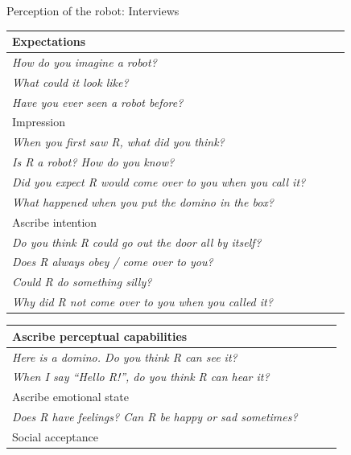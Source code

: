 \documentclass[compress]{beamer}
\renewcommand{\bf}{\Medium}
\begin{document}
\begin{frame}{Perception of the robot: Interviews}
\scriptsize
    \begin{multicols}{2}
    \begin{table}[]
        \begin{tabularx}{\linewidth}{p{0.9\linewidth}}

    \toprule
    {\bf Expectations} \tabularnewline
    \midrule
    \emph{How do you imagine a robot?} \tabularnewline
    \emph{What could it look like?} \tabularnewline
    \emph{Have you ever seen a robot before?} \tabularnewline

    \toprule
    {\bf Impression} \tabularnewline
    \midrule


    \emph{When you first saw R, what did you think?} \tabularnewline
    \emph{Is R a robot? How do you know?} \tabularnewline
    \emph{Did you expect R would come over to you when you call it?} \tabularnewline
    \emph{What happened when you put the domino in the box?} \tabularnewline

    \toprule
    {\bf Ascribe intention} \tabularnewline
    \midrule


    \emph{Do you think R could go out the door all by itself?} \tabularnewline	
    \emph{Does R always obey / come over to you?} \tabularnewline
    \emph{Could R do something silly?} \tabularnewline
    \emph{Why did R not come over to you when you called it?} \tabularnewline

            \bottomrule
        \end{tabularx}
        \label{tab:options}
    \end{table}

    \begin{table}[]
        \begin{tabularx}{\linewidth}{p{0.9\linewidth}}


    \toprule
    {\bf Ascribe perceptual capabilities} \tabularnewline
    \midrule


    \emph{Here is a domino. Do you think R can see it?} \tabularnewline 
    \emph{When I say \textit{``Hello R!''}, do you think R can hear it?} \tabularnewline

    \toprule
    {\bf Ascribe emotional state} \tabularnewline
    \midrule


    \emph{Does R have feelings? Can R be happy or sad sometimes?}
    \tabularnewline

    \toprule
    {\bf Social acceptance} \tabularnewline
    \midrule



\end{tabularx}
\end{table}
\end{multicols}
\end{frame}
\end{document}
